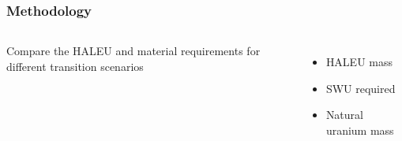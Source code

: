 \begin{frame}
    \frametitle{Methodology}
    \begin{columns}
        \column[t]{5cm}
    Compare the \gls{HALEU} and material requirements for different 
    transition scenarios 
    \begin{itemize}
        \item \gls{HALEU} mass
        \item \gls{SWU} required
        \item Natural uranium mass
    \end{itemize}

    \column[t]{5cm}
    
    \end{columns}
    

\end{frame}